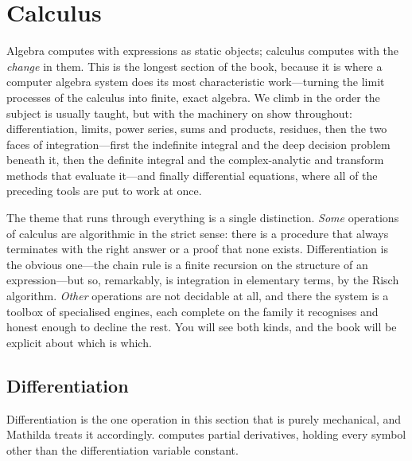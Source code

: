 \section{Calculus}
\label{sec:calculus}

Algebra computes with expressions as static objects; calculus computes with the
\emph{change} in them. This is the longest section of the book, because it is
where a computer algebra system does its most characteristic work---turning the
limit processes of the calculus into finite, exact algebra. We climb in the
order the subject is usually taught, but with the machinery on show throughout:
differentiation, limits, power series, sums and products, residues, then the two faces of
integration---first the indefinite integral and the deep decision problem
beneath it, then the definite integral and the complex-analytic and
transform methods that evaluate it---and finally differential equations, where
all of the preceding tools are put to work at once.

The theme that runs through everything is a single distinction. \emph{Some}
operations of calculus are algorithmic in the strict sense: there is a procedure
that always terminates with the right answer or a proof that none exists.
Differentiation is the obvious one---the chain rule is a finite recursion on the
structure of an expression---but so, remarkably, is integration in elementary
terms, by the Risch algorithm. \emph{Other} operations are not decidable at all,
and there the system is a toolbox of specialised engines, each complete on the
family it recognises and honest enough to decline the rest. You will see both
kinds, and the book will be explicit about which is which.

\subsection{Differentiation}
\label{ssec:calc-deriv}

Differentiation is the one operation in this section that
is purely mechanical, and Mathilda treats it accordingly.  computes partial
derivatives, holding every symbol other than the differentiation variable
constant.

\begin{codepairs}
\end{codepairs}

